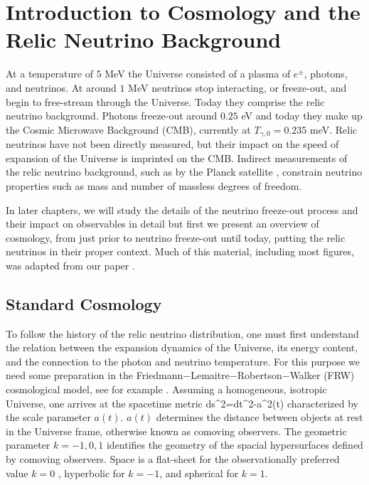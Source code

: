 \section{Introduction to Cosmology and the Relic Neutrino Background}\label{ch:intro}
At a temperature of $5$ MeV the Universe consisted of a plasma of $e^\pm$, photons, and neutrinos.  At around $1$ MeV neutrinos stop interacting, or freeze-out, and begin to free-stream through the Universe. Today they comprise the relic neutrino background. Photons freeze-out around $0.25$ eV and today they make up the Cosmic Microwave Background (CMB), currently at $T_{\gamma,0}=0.235$ meV.  Relic neutrinos have not been directly measured, but their impact on the speed of expansion of the Universe is imprinted on the CMB.  Indirect measurements of the relic neutrino background, such as by the Planck satellite \cite{Planck},  constrain neutrino properties such as mass and number of massless degrees of freedom.

 In later chapters, we will study the details of the neutrino freeze-out process and their impact on observables in detail but first we present an overview of cosmology, from just prior to neutrino freeze-out until today, putting the relic neutrinos in their proper context. Much of this material, including most figures, was adapted from our paper \cite{ErasOfUniverse}.


\subsection{Standard Cosmology}\label{cosmo}
 To follow the history of the relic neutrino distribution, one must first understand the relation between the expansion dynamics of the Universe, its energy content, and the connection to the photon and neutrino temperature. For this purpose we need some preparation in the  Friedmann$-$Lemaitre$-$Robertson$-$Walker (FRW) cosmological  model, see for example \cite{hartle2003gravity,hobson,misner1973gravitation}. Assuming a homogeneous, isotropic Universe, one arrives at the spacetime metric
\beqn\label{metric}
ds^2=dt^2-a^2(t)%
\eeqn
characterized  by the scale parameter $a(t)$.  $a(t)$ determines the distance between objects at rest in the Universe frame, otherwise known as comoving observers. The geometric parameter $k=-1,0,1$ identifies the geometry of the spacial hypersurfaces defined by comoving observers. Space is a flat-sheet for the observationally preferred value $k=0$ \cite{Planck}, hyperbolic for $k=-1$, and spherical for $k=1$.

